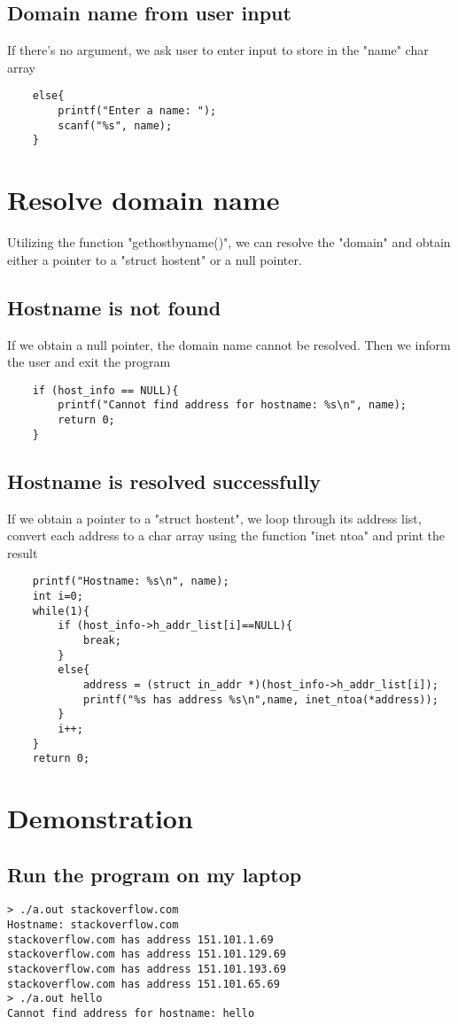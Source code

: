 \documentclass[12pt]{article}
\begin{document}
\subsection{Domain name from user input}
If there's no argument, we ask user to enter input to store in the "name" char array
\begin{verbatim}
    else{
        printf("Enter a name: ");
        scanf("%s", name);
    }
\end{verbatim}
\section{Resolve domain name}
Utilizing the function "gethostbyname()", we can resolve the "domain" and obtain either a pointer to a "struct hostent" or a null pointer.
\subsection{Hostname is not found}
If we obtain a null pointer, the domain name cannot be resolved. Then we inform the user and exit the program
\begin{verbatim}
    if (host_info == NULL){
        printf("Cannot find address for hostname: %s\n", name);
        return 0;
    }
\end{verbatim}
\subsection{Hostname is resolved successfully}
If we obtain a pointer to a "struct hostent", we loop through its address list, convert each address to a char array using the function "inet ntoa" and print the result 
\begin{verbatim}
    printf("Hostname: %s\n", name); 
    int i=0;
    while(1){
        if (host_info->h_addr_list[i]==NULL){
            break;
        }
        else{
            address = (struct in_addr *)(host_info->h_addr_list[i]);
            printf("%s has address %s\n",name, inet_ntoa(*address)); 
        }
        i++;
    }
    return 0;
\end{verbatim}
\section{Demonstration}
\subsection{Run the program on my laptop}
\begin{verbatim}
> ./a.out stackoverflow.com
Hostname: stackoverflow.com
stackoverflow.com has address 151.101.1.69
stackoverflow.com has address 151.101.129.69
stackoverflow.com has address 151.101.193.69
stackoverflow.com has address 151.101.65.69
> ./a.out hello
Cannot find address for hostname: hello

\end{verbatim}
\end{document}
